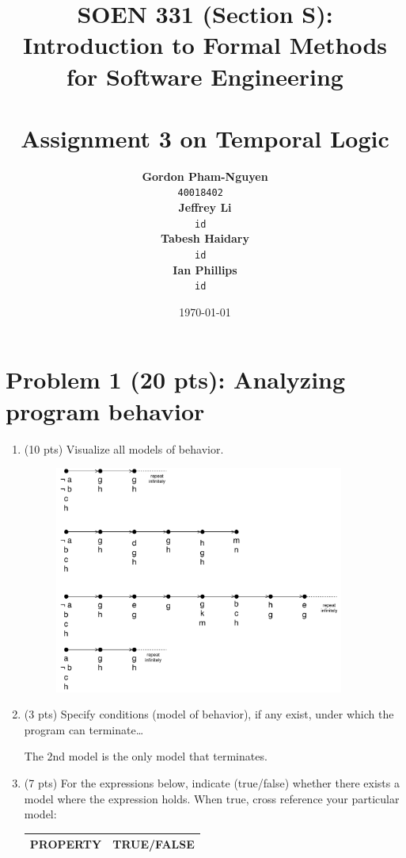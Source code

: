 \documentclass[12pt]{article}
\title{SOEN 331 (Section S): Introduction to Formal Methods\\for Software Engineering\\
\ \\
Assignment 3 on Temporal Logic}
\author{\textbf{Gordon Pham-Nguyen}\\
		\texttt{40018402}
\ \\
\textbf{Jeffrey Li}\\
		\texttt{id}
\ \\
\textbf{Tabesh Haidary}\\
		\texttt{id}
\ \\
\textbf{Ian Phillips}\\
		\texttt{id}
\ \\
}
\date{\today}
\begin{document}
\maketitle

\newpage

\section*{Problem 1 (20 pts):  Analyzing program behavior}

\begin{enumerate}

\item (10 pts) Visualize all models of behavior.

\begin{figure}[h!]
  \centering
  \includegraphics[width=0.9\textwidth]{figures/1_1.pdf}
 \end{figure}

\item (3 pts) Specify conditions (model of behavior), if any exist, under which the program can terminate\dots

The 2nd model is the only model that terminates.

\item (7 pts) For the expressions below, indicate (true/false) whether there exists a
model where the expression holds. When true, cross reference your particular model:

\begin{table}
\centering
\begin{tabular}{|l|l|}
\hline
\textbf{PROPERTY}							& \textbf{TRUE/FALSE}\\
\hline


\end{tabular}
\end{table}
\end{enumerate}
\end{document}
